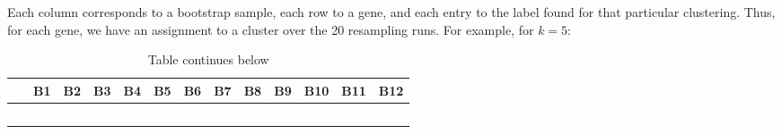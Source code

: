 \documentclass[9pt,a4paper,]{extarticle}
\begin{document}
Each column corresponds to a bootstrap sample, each row to a gene, and each
entry to the label found for that particular clustering. Thus, for each gene,
we have an assignment to a cluster over the 20 resampling runs. For example,
for \(k=5\):

\begin{longtable}[]{@{}ccccccccccccc@{}}
\caption{Table continues below}\tabularnewline
\toprule
\begin{minipage}[b]{0.13\columnwidth}\centering
~\strut
\end{minipage} & \begin{minipage}[b]{0.04\columnwidth}\centering
B1\strut
\end{minipage} & \begin{minipage}[b]{0.04\columnwidth}\centering
B2\strut
\end{minipage} & \begin{minipage}[b]{0.04\columnwidth}\centering
B3\strut
\end{minipage} & \begin{minipage}[b]{0.04\columnwidth}\centering
B4\strut
\end{minipage} & \begin{minipage}[b]{0.04\columnwidth}\centering
B5\strut
\end{minipage} & \begin{minipage}[b]{0.04\columnwidth}\centering
B6\strut
\end{minipage} & \begin{minipage}[b]{0.04\columnwidth}\centering
B7\strut
\end{minipage} & \begin{minipage}[b]{0.04\columnwidth}\centering
B8\strut
\end{minipage} & \begin{minipage}[b]{0.04\columnwidth}\centering
B9\strut
\end{minipage} & \begin{minipage}[b]{0.05\columnwidth}\centering
B10\strut
\end{minipage} & \begin{minipage}[b]{0.05\columnwidth}\centering
B11\strut
\end{minipage} & \begin{minipage}[b]{0.05\columnwidth}\centering
B12\strut
\end{minipage}\tabularnewline
\midrule
\endfirsthead
\toprule
\begin{minipage}[b]{0.13\columnwidth}\centering
~\strut
\end{minipage} & \begin{minipage}[b]{0.04\columnwidth}\centering

\end{minipage}
\end{longtable}
\end{document}
